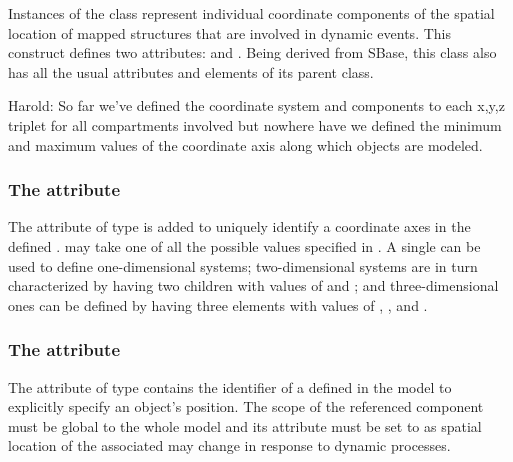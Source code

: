 Instances of the \CoordinateComponent class represent individual coordinate components of the spatial location of mapped \Compartment structures that are involved in dynamic events. This construct defines two attributes:  and . Being derived from SBase, this class also has all the usual attributes and elements of its parent class.

{\color{red} Harold: \notice So far we've defined the coordinate system and components to each x,y,z triplet for all compartments involved but nowhere have we defined the minimum and maximum values of the coordinate axis along which objects are modeled.
}

\subsubsection{The  attribute}
\label{attr:coordIndex}

The attribute  of type  is added to uniquely identify a coordinate axes in the defined .  may take one of all the possible  values specified in . A single  \CoordinateComponent can be used to define one-dimensional systems; two-dimensional systems are in turn characterized by having two \CoordinateComponent children with  values of  and ; and three-dimensional ones can be defined by having three \CoordinateComponent elements with  values of , , and . 

\subsubsection{The  attribute}
\label{attr:variable}

The  attribute of type  contains the identifier of a \Parameter defined in the model to explicitly specify an object's position. The scope of the referenced \Parameter component must be global to the whole model and its  attribute must be set to  as spatial location of the associated \Compartment may change in response to dynamic processes.

